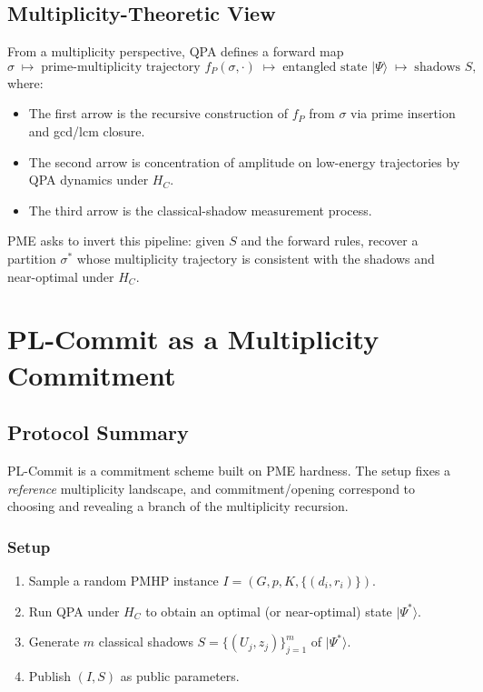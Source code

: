 \documentclass[11pt]{article}
\begin{document}
\subsection{Multiplicity-Theoretic View}

From a multiplicity perspective, QPA defines a forward map
\[
  \sigma \;\mapsto\; \text{prime-multiplicity trajectory } f_P(\sigma,\cdot)
  \;\mapsto\; \text{entangled state } |\Psi\rangle
  \;\mapsto\; \text{shadows } S,
\]
where:

\begin{itemize}
  \item The first arrow is the recursive construction of $f_P$ from $\sigma$ via prime insertion and gcd/lcm closure.
  \item The second arrow is concentration of amplitude on low-energy trajectories by QPA dynamics under $H_C$.
  \item The third arrow is the classical-shadow measurement process.
\end{itemize}

PME asks to invert this pipeline: given $S$ and the forward rules, recover a partition $\sigma^*$ whose multiplicity trajectory is consistent with the shadows and near-optimal under $H_C$.

\section{PL-Commit as a Multiplicity Commitment}

\subsection{Protocol Summary}

PL-Commit is a commitment scheme built on PME hardness. The setup fixes a \emph{reference} multiplicity landscape, and commitment/opening correspond to choosing and revealing a branch of the multiplicity recursion.

\subsubsection*{Setup}

\begin{enumerate}[label=(S\arabic*)]
  \item Sample a random PMHP instance $I = (G,p,K,\{(d_i,r_i)\})$.
  \item Run QPA under $H_C$ to obtain an optimal (or near-optimal) state $|\Psi^*\rangle$.
  \item Generate $m$ classical shadows $S = \{(U_j,z_j)\}_{j=1}^m$ of $|\Psi^*\rangle$.
  \item Publish $(I,S)$ as public parameters.
\end{enumerate}
\end{document}
